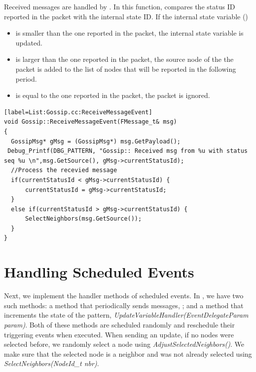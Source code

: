 Received messages are handled by . 
In this function,  compares the status ID reported in the packet with the internal state ID. If the internal state variable ()
\begin{itemize} 
\item  is smaller than the one reported in the packet, the internal state variable is updated. 
\item is larger than the one reported in the packet, the source node of the the packet is added to the list of nodes that will be reported in the following period.  
\item is equal to the one reported in the packet, the packet is ignored. 
\end{itemize}  
\begin{lstlisting}[style=boralargefile] [label=List:Gossip.cc:ReceiveMessageEvent]
void Gossip::ReceiveMessageEvent(FMessage_t& msg)
{
  GossipMsg* gMsg = (GossipMsg*) msg.GetPayload();
 Debug_Printf(DBG_PATTERN, "Gossip:: Received msg from %u with status seq %u \n",msg.GetSource(), gMsg->currentStatusId);
  //Process the recevied message
  if(currentStatusId < gMsg->currentStatusId) {
	  currentStatusId = gMsg->currentStatusId;
  }
  else if(currentStatusId > gMsg->currentStatusId) {
	  SelectNeighbors(msg.GetSource());
  }
}
\end{lstlisting}

\section {Handling Scheduled Events} \label{sec:ScheduledEvents}

Next, we implement the handler methods of scheduled events. 
In , we have two such methods: a method that periodically
sends messages, ; 
and a method that increments the state of the pattern,
\emph{UpdateVariableHandler(EventDelegateParam param)}. 
Both of these methods are scheduled randomly and reschedule their triggering events when executed. 
When sending an update, if no nodes were selected before, we randomly
select a node using \emph{AdjustSelectedNeighbors()}. 
We make sure
that the selected node is a neighbor and was not already selected
using \emph{SelectNeighbors(NodeId\_t nbr)}.

